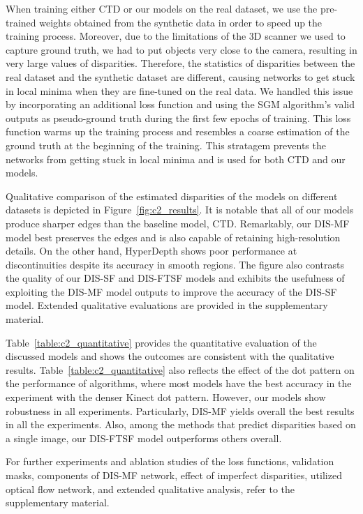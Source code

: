 When training either CTD or our models on the real dataset, we use the pre-trained weights obtained from the synthetic data in order to speed up the training process. Moreover,  due to the limitations of the 3D scanner we used to capture ground truth, we had to put objects very close to the camera, resulting in very large values of disparities. Therefore, the statistics of disparities between the real dataset and the synthetic dataset are different, causing networks to get stuck in local minima when they are fine-tuned on the real data. We handled this issue by incorporating an additional loss function and using the SGM algorithm's valid outputs as pseudo-ground truth during the first few epochs of training. This loss function warms up the training process and resembles a coarse estimation of the ground truth at the beginning of the training. This stratagem prevents the networks from getting stuck in local minima and is used for both CTD and our models.

Qualitative comparison of the estimated disparities of the models on different datasets is depicted in Figure~\ref{fig:c2_results}. It is notable that all of our models produce sharper edges than the baseline model, CTD. Remarkably, our DIS-MF model best preserves the edges and is also capable of retaining high-resolution details. On the other hand, HyperDepth shows poor performance at discontinuities despite its accuracy in smooth regions. The figure also contrasts the quality of our DIS-SF and DIS-FTSF models and exhibits the usefulness of exploiting the DIS-MF model outputs to improve the accuracy of the DIS-SF model. Extended qualitative evaluations are provided in the supplementary material.

Table~\ref{table:c2_quantitative} provides the quantitative evaluation of the discussed models and shows the outcomes are consistent with the qualitative results. Table~\ref{table:c2_quantitative} also reflects the effect of the dot pattern on the performance of algorithms, where most models have the best accuracy in the experiment with the denser Kinect dot pattern. However, our models show robustness in all experiments. Particularly, DIS-MF yields overall the best results in all the experiments. Also, among the methods that predict disparities based on a single image, our DIS-FTSF model outperforms others overall.

For further experiments and ablation studies of the loss functions, validation masks, components of DIS-MF network, effect of imperfect disparities, utilized optical flow network, and extended qualitative analysis, refer to the supplementary material.

